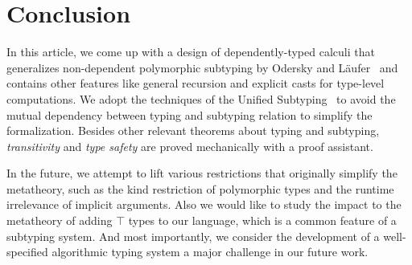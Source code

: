\section{Conclusion}

In this article, we come up with a design of dependently-typed calculi \name
that generalizes non-dependent polymorphic subtyping by Odersky and
L\"aufer~\cite{odersky1996putting} and contains other features like general
recursion and explicit casts for type-level computations.
We adopt the techniques of the Unified Subtyping~\cite{yang2017unifying} to
avoid the mutual dependency between typing and subtyping relation to simplify
the formalization. Besides other relevant theorems about typing and subtyping,
\emph{transitivity} and \emph{type safety} are proved mechanically with a proof assistant.

In the future, we attempt to lift various restrictions that originally simplify
the metatheory, such as the kind restriction of polymorphic
types and the runtime irrelevance of implicit arguments. Also we would like to
study the impact to the metatheory of adding $\top$ types to our language,
which is a common feature of a subtyping system.
And most importantly, we consider the development
of a well-specified algorithmic typing system a major challenge in our future
work.